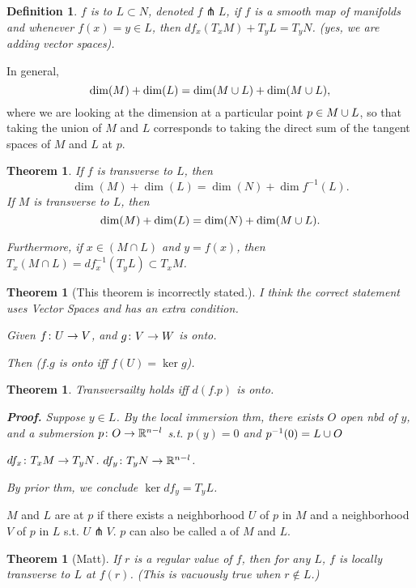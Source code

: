 \documentclass[11pt]{amsbook}
\theoremstyle{mystyle} %
\newtheorem{thrm}[thm]{Theorem}
\newtheorem{defi}[thm]{Definition}
\numberwithin{thm}{section}
\newcommand{\transverse}{\pitchfork}
\begin{document}
\begin{defi}
	$f$ is  to $L \subset N$, denoted $f \transverse L$, if $f$ is a smooth map of manifolds and whenever $f(x) = y \in L$, then $df_x(T_xM) + T_yL = T_yN$.  (yes, we are adding vector spaces).
\end{defi}
\begin{prop}
	In general, $$\dim(M) + \dim(L) = \dim(M \cup L) + \dim(M \cup L),$$ where we are looking at the dimension at a particular point $p \in M \cup L$, so that taking the union of $M$ and $L$ corresponds to taking the direct sum of the tangent spaces of $M$ and $L$ at $p$.
\end{prop}
\begin{thrm}
	If $f$ is transverse to $L$, then $$\dim(M) + \dim(L) = \dim(N) + \dim f^{-1}(L).$$
	If $M$ is transverse to $L$, then $$\dim(M) + \dim(L) = \dim(N) + \dim(M \cup L).$$

	Furthermore, if $x \in (M \cap L)$ and $y = f(x)$, then $T_x (M \cap L) = df^{-1}_x(T_y L) \subset T_x M$.
\end{thrm}
\begin{thrm}[This theorem is incorrectly stated.]
	I think the correct statement uses Vector Spaces and has an extra condition.

	Given $f \colon U \to V$, and
	$g \colon V \to W$ is onto.

	Then ($f.g$ is onto iff $f(U) = \ker g$).
\end{thrm}

\begin{thrm}
	Transversailty holds iff $d(f.p)$ is onto.

	\textbf{Proof.}
	Suppose $y \in L$.
	By the local immersion thm,
	there exists $O$ open nbd of $y$, and a submersion $p \colon O \to {\mathbb R}^{n-l}$
	s.t. $p(y) = 0$ and $p^{-1}(0) = L \cup O$

	$df_x \colon T_xM \to T_yN$.
	$df_y \colon T_yN \to {\mathbb R}^{n-l}$.

	By prior thm, we conclude $\ker df_y = T_yL$.
\end{thrm}

\begin{defn}[Matt]
	$M$ and $L$ are  at $p$ if there exists a neighborhood $U$ of $p$ in $M$ and a neighborhood $V$ of $p$ in $L$ s.t. $U \transverse V$.  $p$ can also be called a  of $M$ and $L$.
\end{defn}

\begin{thrm}[Matt]
	If $r$ is a regular value of $f$, then for any $L$, $f$ is locally transverse to $L$ at $f(r)$.  (This is vacuously true when $r \not\in L$.)
\end{thrm}
\end{document}

